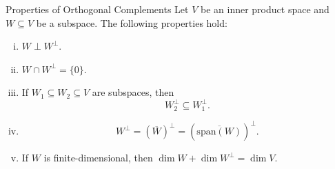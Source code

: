 \begin{proposition}{Properties of Orthogonal Complements}{}
    Let $V$ be an inner product space and $W\subseteq V$ be a subspace. The following properties hold:
    \begin{enumerate}[(i)]
        \item $W\perp W^\perp$.
        \item $W\cap W^\perp = \{0\}$.
        \item If $W_1\subseteq W_2\subseteq V$ are subspaces, then
        \[
            W_2^\perp \subseteq W_1^\perp.
        \]
        \item 
        \[
            W^{\perp} = \left(\overline{W}\right)^\perp=\left(\overline{\mathrm{span}(W)}\right)^\perp.
        \]
        \item If $W$ is finite-dimensional, then $\dim W + \dim W^\perp = \dim V$.
    \end{enumerate}
\end{proposition}

